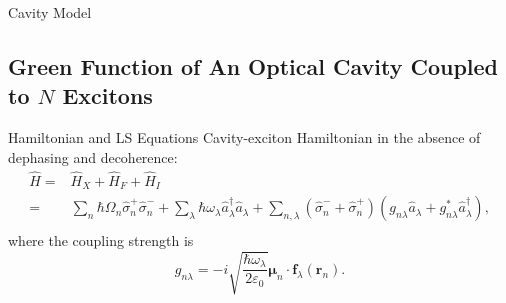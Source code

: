 \documentclass{beamer}
\begin{document}
\begin{frame}{Cavity Model}

\end{frame}


\subsection{Green Function of An Optical Cavity Coupled to $N$ Excitons }

\begin{frame}{Hamiltonian and LS Equations}
Cavity-exciton Hamiltonian in the absence of dephasing and decoherence:
\begin{equation}
\label{eq:h}
\begin{split}
 \hat{H} =& \hat{H}_{X}+\hat{H}_F+\hat{H}_I\\
=& \sum_n\! \hbar \Omega_n \hat{\sigma}_n^+\hat{\sigma}_n^- \! +\!
\sum_\lambda\! \hbar \omega_\lambda
\hat{a}_\lambda^\dagger\hat{a}_\lambda \nonumber +\! \sum_{n,\lambda}\! (
\hat{\sigma}_n^- + \hat{\sigma}_n^+)(g_{n\lambda}
\hat{a}_\lambda+g_{n\lambda}^*\hat{a}_\lambda^\dagger),\\
\end{split}
\end{equation}
where the coupling strength is 
\begin{equation}
g_{n\lambda}=-i\sqrt{\frac{\hbar\omega_\lambda}{2 \varepsilon_0}}\boldsymbol{\mu}_n\cdot \mathbf{f}_\lambda(\mathbf{r}_n).
\end{equation}
\end{frame}
\end{document}
